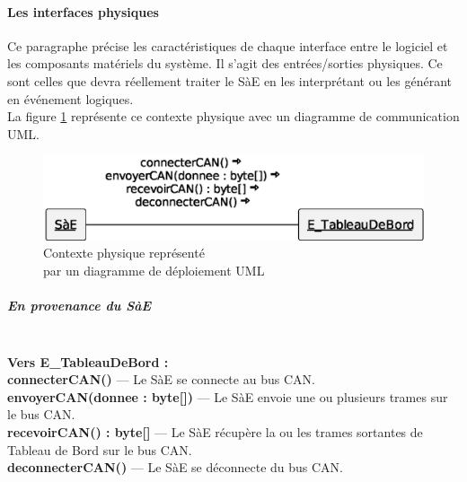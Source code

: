 \paragraph{Les interfaces physiques}
\label{interfaces_physiques}
Ce paragraphe précise les caractéristiques de chaque interface entre le logiciel et les composants matériels du
système. Il s'agit des entrées/sorties physiques. Ce sont celles que devra réellement traiter le SàE 
en les interprétant ou les générant en événement logiques. \\

La figure \ref{schema_contexte_phy} représente ce contexte physique avec un diagramme de communication UML.

\begin{figure}[ht] 
    \centering
    \includegraphics[width=14cm]{../schemas/contexte_phy}
    \caption{Contexte physique représenté \\par un diagramme de déploiement UML}
    \label{schema_contexte_phy}
\end{figure}

\subparagraph{En provenance du SàE}
\mbox{}\\

\textbf{Vers E\_TableauDeBord :} \vspace{0.2cm} \\ %
\textbf{connecterCAN()} --- Le SàE se connecte au bus CAN. \\
\textbf{envoyerCAN(donnee : byte[])} --- Le SàE envoie une ou plusieurs trames sur le bus CAN. \\
\textbf{recevoirCAN() : byte[] }--- Le SàE récupère la ou les trames sortantes de Tableau de Bord sur le bus CAN.  \\
\textbf{deconnecterCAN()} --- Le SàE se déconnecte du bus CAN. \\

